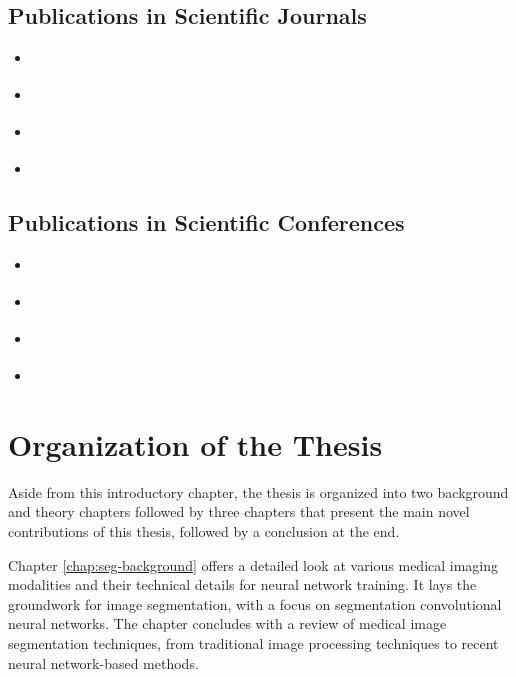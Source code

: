 \subsection{Publications in Scientific Journals}

\begin{itemize}
	\item \cite{bencevicTrainingPolarImage2021} 
	\item \cite{bencevicRecentProgressEpicardial2022} 
	\item \cite{bencevicSegmentthenSegmentContextPreservingCropBased2023a} 
	\item \cite{bencevicUnderstandingSkinColor2024} 
\end{itemize}

\subsection{Publications in Scientific Conferences}

\begin{itemize}
	\item \cite{bencevicEpicardialAdiposeTissue2021} 
	\item \cite{bencevicUsingPolarTransform2022a} 
	\item \cite{bencevicSelfsupervisedLearningMeans2022} 
	\item \cite{verchevalCounterfactualFunctionalConnectomes2023} 
\end{itemize}


\section{Organization of the Thesis}

Aside from this introductory chapter, the thesis is organized into two background and theory chapters followed by three chapters that present the main novel contributions of this thesis, followed by a conclusion at the end.

Chapter \ref{chap:seg-background} offers a detailed look at various medical imaging modalities and their technical details for neural network training. It lays the groundwork for image segmentation, with a focus on segmentation convolutional neural networks. The chapter concludes with a review of medical image segmentation techniques, from traditional image processing techniques to recent neural network-based methods.

